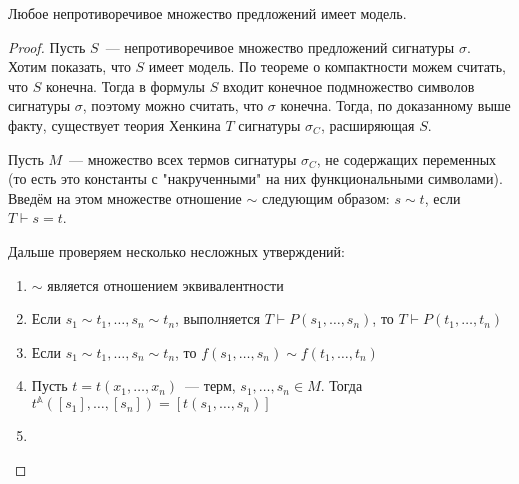 \begin{theorem}
Любое непротиворечивое множество предложений имеет модель.
\end{theorem}

\begin{proof}
    Пусть $S$~— непротиворечивое множество предложений сигнатуры $\sigma$. Хотим показать, что $S$ имеет модель. По теореме о компактности можем считать, что $S$ конечна. Тогда в формулы $S$ входит конечное подмножество символов сигнатуры $\sigma$, поэтому можно считать, что $\sigma$ конечна. Тогда, по доказанному выше факту, существует теория Хенкина $T$ сигнатуры $\sigma_C$, расширяющая $S$.

    Пусть $M$~— множество всех термов сигнатуры $\sigma_C$, не содержащих переменных (то есть это константы с "накрученными" на них функциональными символами). Введём на этом множестве отношение $\sim$ следующим образом: $s\sim t$, если $T\vdash s=t$.

    Дальше проверяем несколько несложных утверждений:
    \begin{enumerate}
        \item $\sim$ является отношением эквивалентности
        \item Если $s_1\sim t_1, \ldots, s_n\sim t_n$, выполняется $T\vdash P(s_1, \ldots, s_n)$, то $T\vdash P(t_1, \ldots, t_n)$
        \item Если $s_1\sim t_1, \ldots, s_n\sim t_n$, то $f(s_1, \ldots, s_n)\sim f(t_1, \ldots, t_n)$
        \item Пусть $t = t(x_1, \ldots, x_n)$~— терм, $s_1, \ldots, s_n\in M$. Тогда $t^\mathbb{A}([s_1], \ldots, [s_n]) = [t(s_1, \ldots, s_n)]$
        \item %
    \end{enumerate}
\end{proof}
